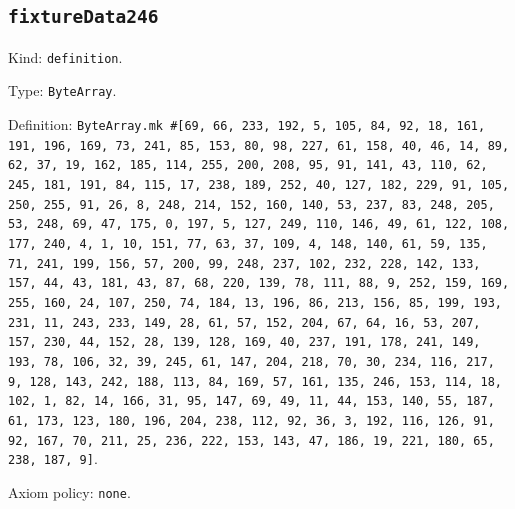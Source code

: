 \documentclass[11pt]{article}
\begin{document}
\subsection*{\texttt{fixtureData246}}
\noindent Kind: \texttt{definition}.\par
\noindent Type: \texttt{ByteArray}.\par
\noindent Definition: \texttt{ByteArray.mk \#[69, 66, 233, 192, 5, 105, 84, 92, 18, 161, 191, 196, 169, 73, 241, 85, 153, 80, 98, 227, 61, 158, 40, 46, 14, 89, 62, 37, 19, 162, 185, 114, 255, 200, 208, 95, 91, 141, 43, 110, 62, 245, 181, 191, 84, 115, 17, 238, 189, 252, 40, 127, 182, 229, 91, 105, 250, 255, 91, 26, 8, 248, 214, 152, 160, 140, 53, 237, 83, 248, 205, 53, 248, 69, 47, 175, 0, 197, 5, 127, 249, 110, 146, 49, 61, 122, 108, 177, 240, 4, 1, 10, 151, 77, 63, 37, 109, 4, 148, 140, 61, 59, 135, 71, 241, 199, 156, 57, 200, 99, 248, 237, 102, 232, 228, 142, 133, 157, 44, 43, 181, 43, 87, 68, 220, 139, 78, 111, 88, 9, 252, 159, 169, 255, 160, 24, 107, 250, 74, 184, 13, 196, 86, 213, 156, 85, 199, 193, 231, 11, 243, 233, 149, 28, 61, 57, 152, 204, 67, 64, 16, 53, 207, 157, 230, 44, 152, 28, 139, 128, 169, 40, 237, 191, 178, 241, 149, 193, 78, 106, 32, 39, 245, 61, 147, 204, 218, 70, 30, 234, 116, 217, 9, 128, 143, 242, 188, 113, 84, 169, 57, 161, 135, 246, 153, 114, 18, 102, 1, 82, 14, 166, 31, 95, 147, 69, 49, 11, 44, 153, 140, 55, 187, 61, 173, 123, 180, 196, 204, 238, 112, 92, 36, 3, 192, 116, 126, 91, 92, 167, 70, 211, 25, 236, 222, 153, 143, 47, 186, 19, 221, 180, 65, 238, 187, 9]}.\par
\noindent Axiom policy: \texttt{none}.\par
\end{document}
